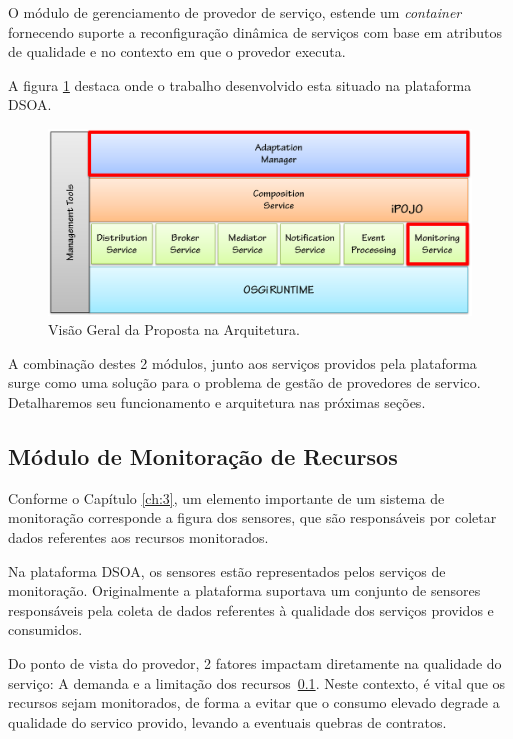 O módulo de gerenciamento de provedor de serviço, estende um \textit{container} fornecendo suporte a reconfiguração dinâmica de serviços com base em atributos de qualidade e no contexto em que o provedor executa.

A figura \ref{fig:proposal} destaca onde o trabalho desenvolvido esta situado na plataforma DSOA.

\begin{figure}[htp]
\centering
\includegraphics[width=13cm]{chapters/chapter4/dsoa-provider-manager.png}
\caption[Visão Geral da Proposta na Arquitetura]{Visão Geral da Proposta na Arquitetura.}
\label{fig:proposal}
\end{figure}

A combinação destes 2 módulos, junto aos serviços providos pela plataforma surge como uma solução para o problema de gestão de provedores de servico. Detalharemos seu funcionamento e arquitetura nas próximas seções.


\subsection{Módulo de Monitoração de Recursos}

Conforme o Capítulo \ref{ch:3}, um elemento importante de um sistema de monitoração corresponde a figura dos sensores, que são responsáveis por coletar dados referentes aos recursos monitorados.

Na plataforma DSOA, os sensores estão representados pelos serviços de monitoração. Originalmente a plataforma suportava um conjunto de sensores responsáveis pela coleta de dados referentes à qualidade dos serviços providos e consumidos.

Do ponto de vista do provedor, 2 fatores impactam diretamente na qualidade do serviço: A demanda e a limitação dos recursos~\ref{}. Neste contexto, é vital que os recursos sejam monitorados, de forma a evitar que o consumo elevado degrade a qualidade do servico provido, levando a eventuais quebras de contratos.

